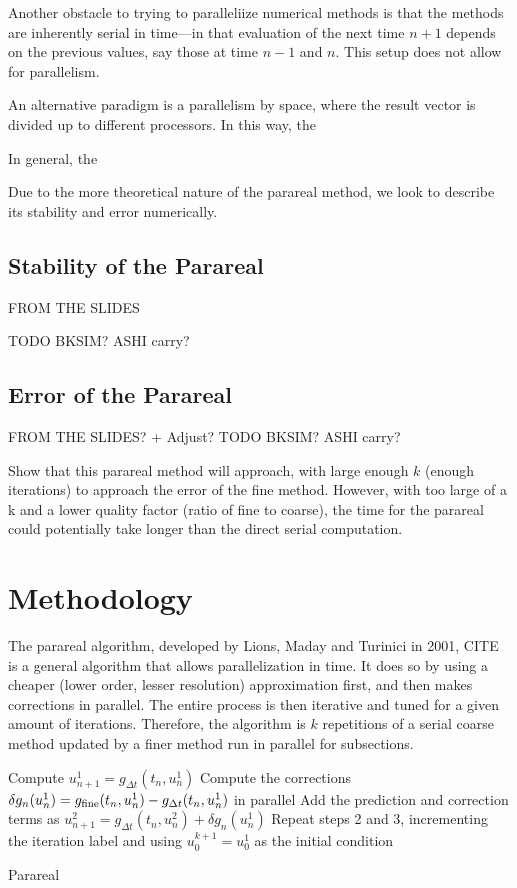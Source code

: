 \documentclass[letterpaper,twocolumn,11pt]{article}
\begin{document}
Another obstacle to trying to paralleliize numerical methods is that the methods
are inherently serial in time---in that evaluation of the next time $n+1$
depends on the previous values, say those at time $n-1$ and $n$. This setup
does not allow for parallelism.

 An alternative paradigm is a parallelism by space, where the result vector is
 divided up to different processors.  In this way, the 

In general, the

Due to the more theoretical nature of the parareal method, we look to describe
its stability and error numerically.

\subsection{Stability of the Parareal}

FROM THE SLIDES 

TODO BKSIM? ASHI carry?

\subsection{Error of the Parareal}

FROM THE SLIDES? + Adjust?
TODO BKSIM? ASHI carry?

Show that this parareal method will approach, with large enough $k$ (enough
iterations) to approach the error of the fine method. However, with too large
of a k and a lower quality factor (ratio of fine to coarse), the time for the
parareal could potentially take longer than the direct serial computation.

\section{Methodology}

The parareal algorithm, developed by Lions, Maday and Turinici in 2001, CITE is
a general algorithm that allows parallelization in time.  It does so by using a
cheaper (lower order, lesser resolution) approximation first, and then makes
corrections in parallel. The entire process is then iterative and tuned for a
given amount of iterations. Therefore, the algorithm is $k$ repetitions of a
serial coarse method updated by a finer method run in parallel for subsections.

\begin{algorithm}[t]
    Compute $u^1_{n+1} = g_{\Delta t}(t_n, u^1_n)$\;
    Compute the corrections $\delta g_n(u^1_n) = g_{\textnormal{fine}}(t_n,
    u^1_n) - g_{\Delta t}(t_n, u^1_n)$ in parallel\;
    Add the prediction and correction terms as $u^2_{n+1} = g_{\Delta t}(t_n,
    u^2_n) + \delta g_n(u^1_n)$\;
    Repeat steps 2 and 3, incrementing the iteration label and using $u^{k+1}_0
    = u^1_0$ as the initial condition\;
 \caption{Parareal}
 \label{alg:parareal}
\end{algorithm}
\end{document}
